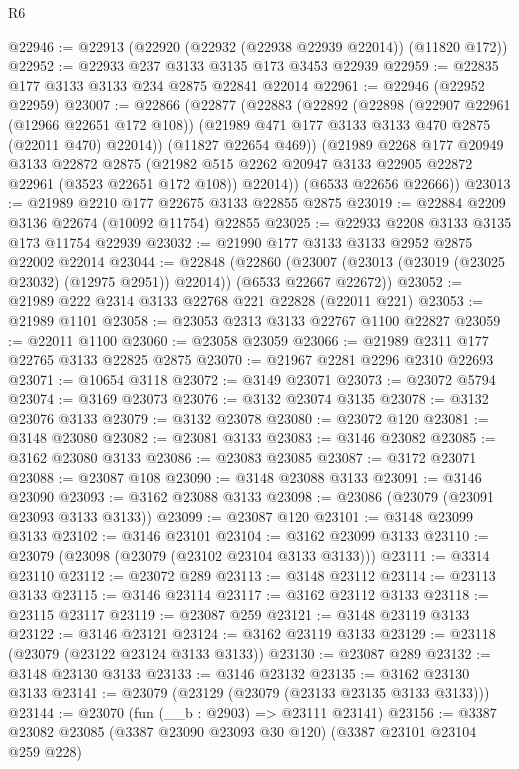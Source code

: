 \begin{lexlean}{R6}
\begin{coremodule}
@22946 := @22913 (@22920 (@22932 (@22938 @22939 @22014)) (@11820 @172))
@22952 := @22933 @237 @3133 @3135 @173 @3453 @22939
@22959 := @22835 @177 @3133 @3133 @234 @2875 @22841 @22014
@22961 := @22946 (@22952 @22959)
@23007 := @22866
    (@22877
      (@22883
        (@22892
          (@22898
            (@22907 @22961 (@12966 @22651 @172 @108))
            (@21989 @471 @177 @3133 @3133 @470 @2875 (@22011 @470) @22014))
          (@11827 @22654 @469))
        (@21989
          @2268
          @177
          @20949
          @3133
          @22872
          @2875
          (@21982 @515 @2262 @20947 @3133 @22905 @22872 @22961 (@3523 @22651 @172 @108))
          @22014))
      (@6533 @22656 @22666))
@23013 := @21989 @2210 @177 @22675 @3133 @22855 @2875
@23019 := @22884 @2209 @3136 @22674 (@10092 @11754) @22855
@23025 := @22933 @2208 @3133 @3135 @173 @11754 @22939
@23032 := @21990 @177 @3133 @3133 @2952 @2875 @22002 @22014
@23044 := @22848
    (@22860 (@23007 (@23013 (@23019 (@23025 @23032) (@12975 @2951)) @22014)) (@6533 @22667 @22672))
@23052 := @21989 @222 @2314 @3133 @22768 @221 @22828 (@22011 @221)
@23053 := @21989 @1101
@23058 := @23053 @2313 @3133 @22767 @1100 @22827
@23059 := @22011 @1100
@23060 := @23058 @23059
@23066 := @21989 @2311 @177 @22765 @3133 @22825 @2875
@23070 := @21967 @2281 @2296 @2310 @22693
@23071 := @10654 @3118
@23072 := @3149 @23071
@23073 := @23072 @5794
@23074 := @3169 @23073
@23076 := @3132 @23074 @3135
@23078 := @3132 @23076 @3133
@23079 := @3132 @23078
@23080 := @23072 @120
@23081 := @3148 @23080
@23082 := @23081 @3133
@23083 := @3146 @23082
@23085 := @3162 @23080 @3133
@23086 := @23083 @23085
@23087 := @3172 @23071
@23088 := @23087 @108
@23090 := @3148 @23088 @3133
@23091 := @3146 @23090
@23093 := @3162 @23088 @3133
@23098 := @23086 (@23079 (@23091 @23093 @3133 @3133))
@23099 := @23087 @120
@23101 := @3148 @23099 @3133
@23102 := @3146 @23101
@23104 := @3162 @23099 @3133
@23110 := @23079 (@23098 (@23079 (@23102 @23104 @3133 @3133)))
@23111 := @3314 @23110
@23112 := @23072 @289
@23113 := @3148 @23112
@23114 := @23113 @3133
@23115 := @3146 @23114
@23117 := @3162 @23112 @3133
@23118 := @23115 @23117
@23119 := @23087 @259
@23121 := @3148 @23119 @3133
@23122 := @3146 @23121
@23124 := @3162 @23119 @3133
@23129 := @23118 (@23079 (@23122 @23124 @3133 @3133))
@23130 := @23087 @289
@23132 := @3148 @23130 @3133
@23133 := @3146 @23132
@23135 := @3162 @23130 @3133
@23141 := @23079 (@23129 (@23079 (@23133 @23135 @3133 @3133)))
@23144 := @23070 (fun (__b : @2903) => @23111 @23141)
@23156 := @3387 @23082 @23085 (@3387 @23090 @23093 @30 @120) (@3387 @23101 @23104 @259 @228)

\end{coremodule}
\end{lexlean}
